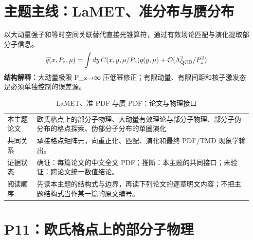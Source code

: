 \documentclass[UTF8,11pt,oneside]{ctexbook}
\begin{document}
\chapter*{主题主线：LaMET、准分布与赝分布}
以大动量强子和等时空间关联替代直接光锥算符，通过有效场论匹配与演化提取部分子信息。
\begin{equation}
  \widetilde q(x,P_z,\mu)=\int dy\,C(x,y,\mu/P_z)q(y,\mu)+\mathcal O(\Lambda_{\rm QCD}^{2}/P_z^{2})
\end{equation}
\noindent\textbf{结构解释：}大动量极限 P\_z→∞ 压低幂修正；有限动量、有限间距和核子激发态是必须单独控制的误差源。
\begin{table}[htbp]
  \centering
  \caption{LaMET、准 PDF 与赝 PDF：论文与物理接口}
  \small
  \begin{tabularx}{0.96\textwidth}{@{}p{3.3cm}>{\raggedright\arraybackslash}X@{}}
    \toprule
    本主题论文 & 欧氏格点上的部分子物理、大动量有效理论与部分子物理、部分子伪分布的格点探索、伪部分子分布的单圈演化 \\
    共同关系 & 承接格点矩阵元，向重正化、匹配、演化和最终 PDF/TMD 现象学输出。 \\
    证据状态 & 确证：每篇论文的中文全文 PDF；推断：本主题的共同接口；未验证：跨论文统一数值结论。 \\
    阅读顺序 & 先读本主题的结构式与边界，再读下列论文的逐章明文内容；不把主题结构式当作某一篇的原文编号。 \\
    \bottomrule
  \end{tabularx}
\end{table}

\chapter{P11：欧氏格点上的部分子物理}
\end{document}
